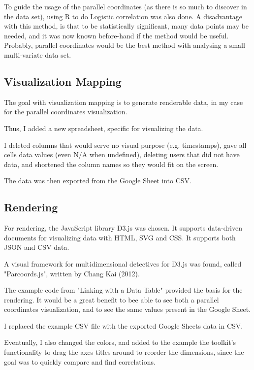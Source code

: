 To guide the usage of the parallel coordinates (as there is so much to discover in the data set), using R to do Logistic correlation was also done. A disadvantage with this method, is that to be statistically significant, many data points may be needed, and it was now known before-hand if the method would be useful. Probably, parallel coordinates would be the best method with analysing a small multi-variate data set.

\subsection{Visualization Mapping}
The goal with visualization mapping is to generate renderable data, in my case for the parallel coordinates visualization.

Thus, I added a new spreadsheet, specific for visualizing the data.

I deleted columns that would serve no visual purpose (e.g. timestamps), gave all cells data values (even N/A when undefined), deleting users that did not have data, and shortened the column names so they would fit on the screen.

The data was then exported from the Google Sheet into CSV.

\subsection{Rendering}

For rendering, the JavaScript library D3.js was chosen. It supports data-driven documents for visualizing data with HTML, SVG and CSS. It supports both JSON and CSV data.

A visual framework for multidimensional detectives for D3.js was found, called "Parcoords.js", written by Chang Kai (2012).

The example code from "Linking with a Data Table" provided the basis for the rendering. It would be a great benefit to bee able to see both a parallel coordinates visualization, and to see the same values present in the Google Sheet. %

I replaced the example CSV file with the exported Google Sheets data in CSV.

Eventually, I also changed the colors, and added to the example the toolkit's functionality to drag the axes titles around to reorder the dimensions, since the goal was to quickly compare and find correlations.

